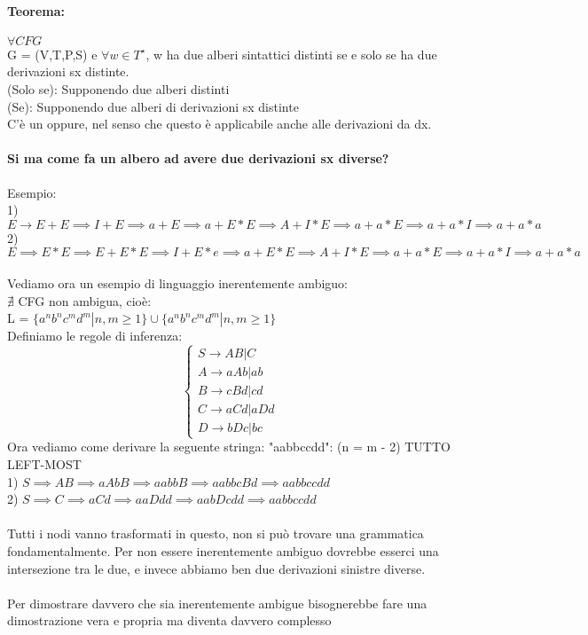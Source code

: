 \documentclass[12pt, a4paper, openany, oneside]{book}
\begin{document}
\paragraph{Teorema: } $\forall CFG$ \\
G = (V,T,P,S) e $\forall w\in T^{\star}$, w ha due alberi sintattici distinti se e
solo se ha due derivazioni sx distinte. \\
(Solo se): Supponendo due alberi distinti \\
(Se): Supponendo due alberi di derivazioni sx distinte\\ 
C'è un oppure, nel senso che questo è applicabile anche alle derivazioni da dx.
\paragraph{Si ma come fa un albero ad avere due derivazioni sx diverse?}
Esempio:\\
1) $E \to E + E \implies I + E \implies a + E \implies a + E * E \implies A + I * E
\implies a + a * E \implies a + a * I \implies a + a * a $\\
2) $E \implies E * E \implies E + E * E \implies I + E * e \implies a + E * E \implies A + I * E
\implies a + a * E \implies a + a * I \implies a + a * a $ \\ \\ 
Vediamo ora un esempio di linguaggio inerentemente ambiguo: \\
$\nexists$ CFG non ambigua, cioè: \\
L = $\{a^{n} b^{n} c^{m} d^{m} | n, m \geq 1\} \cup 
\{a^{n} b^{n} c^{m} d^{m} | n, m \geq 1\}$ \\
Definiamo le regole di inferenza: \\
\[\begin{cases}
S \to AB|C \\
A \to aAb|ab \\
B \to cBd|cd \\
C \to aCd|aDd \\
D \to bDc|bc 
\end{cases}\]
Ora vediamo come derivare la seguente stringa: "aabbccdd": (n = m - 2) TUTTO LEFT-MOST\\
1) $S \implies AB \implies aAbB \implies aabbB \implies aabbcBd \implies aabbccdd$ \\
2) $S \implies C \implies aCd \implies aaDdd \implies aabDcdd \implies aabbccdd$ \\
\\
Tutti i nodi vanno trasformati in questo, non si può trovare una grammatica 
fondamentalmente. Per non essere inerentemente ambiguo dovrebbe esserci una 
intersezione tra le due, e invece abbiamo ben due derivazioni sinistre diverse.
\\ \\
Per dimostrare davvero che sia inerentemente ambigue bisognerebbe fare una 
dimostrazione vera e propria ma diventa davvero complesso
\end{document}
